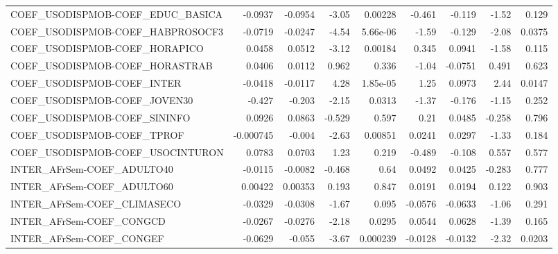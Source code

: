 \begin{tabular}{lrrrrrrrr}
COEF\_USODISPMOB-COEF\_EDUC\_BASICA      &     -0.0937 &      -0.0954 &   -3.05 &  0.00228 &     -0.461 &      -0.119 &        -1.52 &         0.129 \\
COEF\_USODISPMOB-COEF\_HABPROSOCF3      &     -0.0719 &      -0.0247 &   -4.54 & 5.66e-06 &      -1.59 &      -0.129 &        -2.08 &        0.0375 \\
COEF\_USODISPMOB-COEF\_HORAPICO         &      0.0458 &       0.0512 &   -3.12 &  0.00184 &      0.345 &      0.0941 &        -1.58 &         0.115 \\
COEF\_USODISPMOB-COEF\_HORASTRAB        &      0.0406 &       0.0112 &   0.962 &    0.336 &      -1.04 &     -0.0751 &        0.491 &         0.623 \\
COEF\_USODISPMOB-COEF\_INTER            &     -0.0418 &      -0.0117 &    4.28 & 1.85e-05 &       1.25 &      0.0973 &         2.44 &        0.0147 \\
COEF\_USODISPMOB-COEF\_JOVEN30          &      -0.427 &       -0.203 &   -2.15 &   0.0313 &      -1.37 &      -0.176 &        -1.15 &         0.252 \\
COEF\_USODISPMOB-COEF\_SININFO          &      0.0926 &       0.0863 &  -0.529 &    0.597 &       0.21 &      0.0485 &       -0.258 &         0.796 \\
COEF\_USODISPMOB-COEF\_TPROF            &   -0.000745 &       -0.004 &   -2.63 &  0.00851 &     0.0241 &      0.0297 &        -1.33 &         0.184 \\
COEF\_USODISPMOB-COEF\_USOCINTURON      &      0.0783 &       0.0703 &    1.23 &    0.219 &     -0.489 &      -0.108 &        0.557 &         0.577 \\
INTER\_AFrSem-COEF\_ADULTO40            &     -0.0115 &      -0.0082 &  -0.468 &     0.64 &     0.0492 &      0.0425 &       -0.283 &         0.777 \\
INTER\_AFrSem-COEF\_ADULTO60            &     0.00422 &      0.00353 &   0.193 &    0.847 &     0.0191 &      0.0194 &        0.122 &         0.903 \\
INTER\_AFrSem-COEF\_CLIMASECO           &     -0.0329 &      -0.0308 &   -1.67 &    0.095 &    -0.0576 &     -0.0633 &        -1.06 &         0.291 \\
INTER\_AFrSem-COEF\_CONGCD              &     -0.0267 &      -0.0276 &   -2.18 &   0.0295 &     0.0544 &      0.0628 &        -1.39 &         0.165 \\
INTER\_AFrSem-COEF\_CONGEF              &     -0.0629 &       -0.055 &   -3.67 & 0.000239 &    -0.0128 &     -0.0132 &        -2.32 &        0.0203 \\

\end{tabular}
